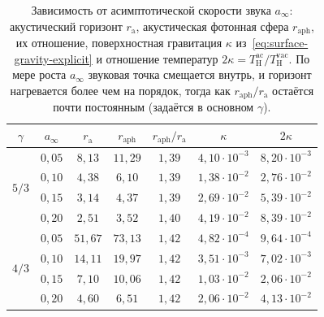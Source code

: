 \documentclass[12pt,a4paper,preprint]{elsarticle}
\begin{document}
            \begin{table}[htb]
                \centering
                \caption{Зависимость от асимптотической скорости звука $a_{\infty}$: акустический горизонт $r_{\mathrm{a}}$, акустическая фотонная сфера $r_{\mathrm{aph}}$, их отношение, поверхностная гравитация $\kappa$ из~\eqref{eq:surface-gravity-explicit} и отношение температур $2\kappa=T^{\mathrm{ac}}_{\mathrm{H}}/T^{\mathrm{vac}}_{\mathrm{H}}$. По мере роста $a_{\infty}$ звуковая точка смещается внутрь, и горизонт нагревается более чем на порядок, тогда как $r_{\mathrm{aph}}/r_{\mathrm{a}}$ остаётся почти постоянным (задаётся в основном $\gamma$).}
                \label{tab:ainf-scan}
                {\small
                \begin{tabular}{ccccccc}
                    \toprule
                    $\gamma$ & $a_{\infty}$ & $r_{\mathrm{a}}$ & $r_{\mathrm{aph}}$ & $r_{\mathrm{aph}}/r_{\mathrm{a}}$ & $\kappa$ & $2\kappa$ \\
                    \midrule
                    \multirow{4}{*}{$5/3$}
                    & $0{,}05$ & $8{,}13$ & $11{,}29$ & $1{,}39$ & $4{,}10\cdot 10^{-3}$ & $8{,}20\cdot 10^{-3}$ \\
                    & $0{,}10$ & $4{,}38$ & $6{,}10$  & $1{,}39$ & $1{,}38\cdot 10^{-2}$ & $2{,}76\cdot 10^{-2}$ \\
                    & $0{,}15$ & $3{,}14$ & $4{,}37$  & $1{,}39$ & $2{,}69\cdot 10^{-2}$ & $5{,}39\cdot 10^{-2}$ \\
                    & $0{,}20$ & $2{,}51$ & $3{,}52$  & $1{,}40$ & $4{,}19\cdot 10^{-2}$ & $8{,}39\cdot 10^{-2}$ \\
                    \midrule
                    \multirow{4}{*}{$4/3$}
                    & $0{,}05$ & $51{,}67$ & $73{,}13$ & $1{,}42$ & $4{,}82\cdot 10^{-4}$ & $9{,}64\cdot 10^{-4}$ \\
                    & $0{,}10$ & $14{,}11$ & $19{,}97$ & $1{,}42$ & $3{,}51\cdot 10^{-3}$ & $7{,}02\cdot 10^{-3}$ \\
                    & $0{,}15$ & $7{,}10$  & $10{,}06$ & $1{,}42$ & $1{,}03\cdot 10^{-2}$ & $2{,}06\cdot 10^{-2}$ \\
                    & $0{,}20$ & $4{,}60$  & $6{,}51$  & $1{,}42$ & $2{,}06\cdot 10^{-2}$ & $4{,}13\cdot 10^{-2}$ \\
                    \bottomrule
                \end{tabular}
                }
            \end{table}
\end{document}
